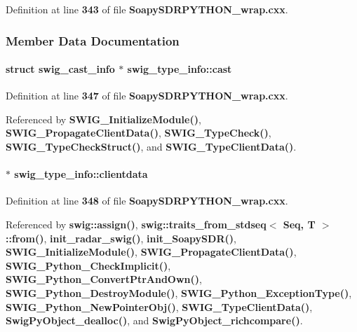 Definition at line {\bf 343} of file {\bf Soapy\+S\+D\+R\+P\+Y\+T\+H\+O\+N\+\_\+wrap.\+cxx}.



\subsubsection{Member Data Documentation}
\paragraph[{cast}]{\setlength{\rightskip}{0pt plus 5cm}struct {\bf swig\+\_\+cast\+\_\+info} $\ast$ swig\+\_\+type\+\_\+info\+::cast}\label{structswig__type__info_ae535f16234db99893f07880cb94a848e}


Definition at line {\bf 347} of file {\bf Soapy\+S\+D\+R\+P\+Y\+T\+H\+O\+N\+\_\+wrap.\+cxx}.



Referenced by {\bf S\+W\+I\+G\+\_\+\+Initialize\+Module()}, {\bf S\+W\+I\+G\+\_\+\+Propagate\+Client\+Data()}, {\bf S\+W\+I\+G\+\_\+\+Type\+Check()}, {\bf S\+W\+I\+G\+\_\+\+Type\+Check\+Struct()}, and {\bf S\+W\+I\+G\+\_\+\+Type\+Client\+Data()}.

\paragraph[{clientdata}]{ $\ast$ swig\+\_\+type\+\_\+info\+::clientdata}\label{structswig__type__info_a2e1f9087e639dd7c8c131fbc6e399194}


Definition at line {\bf 348} of file {\bf Soapy\+S\+D\+R\+P\+Y\+T\+H\+O\+N\+\_\+wrap.\+cxx}.



Referenced by {\bf swig\+::assign()}, {\bf swig\+::traits\+\_\+from\+\_\+stdseq$<$ Seq, T $>$\+::from()}, {\bf init\+\_\+radar\+\_\+swig()}, {\bf init\+\_\+\+Soapy\+S\+D\+R()}, {\bf S\+W\+I\+G\+\_\+\+Initialize\+Module()}, {\bf S\+W\+I\+G\+\_\+\+Propagate\+Client\+Data()}, {\bf S\+W\+I\+G\+\_\+\+Python\+\_\+\+Check\+Implicit()}, {\bf S\+W\+I\+G\+\_\+\+Python\+\_\+\+Convert\+Ptr\+And\+Own()}, {\bf S\+W\+I\+G\+\_\+\+Python\+\_\+\+Destroy\+Module()}, {\bf S\+W\+I\+G\+\_\+\+Python\+\_\+\+Exception\+Type()}, {\bf S\+W\+I\+G\+\_\+\+Python\+\_\+\+New\+Pointer\+Obj()}, {\bf S\+W\+I\+G\+\_\+\+Type\+Client\+Data()}, {\bf Swig\+Py\+Object\+\_\+dealloc()}, and {\bf Swig\+Py\+Object\+\_\+richcompare()}.

